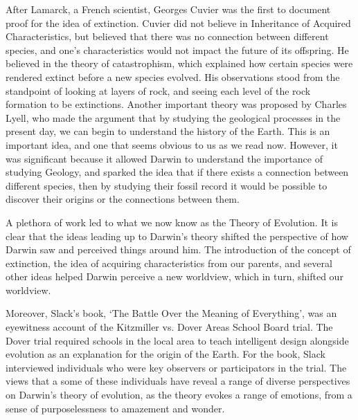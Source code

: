 \documentclass[11pt, oneside]{article}
\begin{document}
\par After Lamarck, a French scientist, Georges Cuvier was the first to document proof for the idea of extinction. Cuvier did not believe in Inheritance of Acquired Characteristics, but believed that there was no connection between different species, and one's characteristics would not impact the future of its offspring. He believed in the theory of catastrophism, which explained how certain species were rendered extinct before a new species evolved. His observations stood from the standpoint of looking at layers of rock, and seeing each level of the rock formation to be extinctions. Another important theory was proposed by Charles Lyell, who made the argument that by studying the geological processes in the present day, we can begin to understand the history of the Earth. This is an important idea, and one that seems obvious to us as we read now. However, it was significant because it allowed Darwin to understand the importance of studying Geology, and sparked the idea that if there exists a connection between different species, then by studying their fossil record it would be possible to discover their origins or the connections between them. 

\par A plethora of work led to what we now know as the Theory of Evolution. It is clear that the ideas leading up to Darwin's theory shifted the perspective of how Darwin saw and perceived things around him. The introduction of the concept of extinction, the idea of acquiring characteristics from our parents, and several other ideas helped Darwin perceive a new worldview, which in turn, shifted our worldview.

\par Moreover, Slack's book, `The Battle Over the Meaning of Everything', was an eyewitness account of the Kitzmiller vs. Dover Areas School Board trial. The Dover trial required schools in the local area to teach intelligent design alongside evolution as an explanation for the origin of the Earth. For the book, Slack interviewed individuals who were key observers or participators in the trial. The views that a some of these individuals have reveal a range of diverse perspectives on Darwin's theory of evolution, as the theory evokes a range of emotions, from a sense of purposelessness to amazement and wonder.
\end{document}

